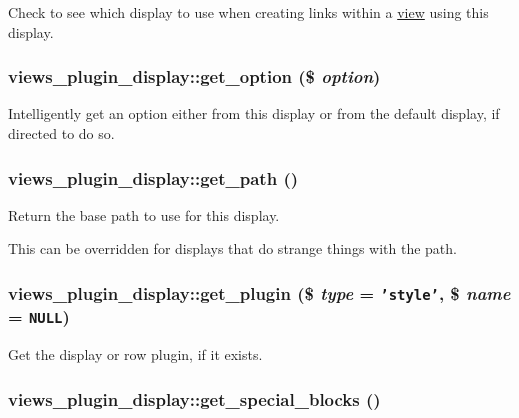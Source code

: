 Check to see which display to use when creating links within a \hyperlink{classview}{view} using this display. \hypertarget{classviews__plugin__display_d2a856f65cb78867204d4f7f877b2972}{
\subsubsection[{get\_\-option}]{\setlength{\rightskip}{0pt plus 5cm}views\_\-plugin\_\-display::get\_\-option (\$ {\em option})}}
\label{classviews__plugin__display_d2a856f65cb78867204d4f7f877b2972}


Intelligently get an option either from this display or from the default display, if directed to do so. \hypertarget{classviews__plugin__display_c9a045f84e31fbe0513482170bd61c01}{
\subsubsection[{get\_\-path}]{\setlength{\rightskip}{0pt plus 5cm}views\_\-plugin\_\-display::get\_\-path ()}}
\label{classviews__plugin__display_c9a045f84e31fbe0513482170bd61c01}


Return the base path to use for this display.

This can be overridden for displays that do strange things with the path. \hypertarget{classviews__plugin__display_7a38d9a80eed86c5c00f7d66002fbf8d}{
\subsubsection[{get\_\-plugin}]{\setlength{\rightskip}{0pt plus 5cm}views\_\-plugin\_\-display::get\_\-plugin (\$ {\em type} = {\tt 'style'}, \/  \$ {\em name} = {\tt NULL})}}
\label{classviews__plugin__display_7a38d9a80eed86c5c00f7d66002fbf8d}


Get the display or row plugin, if it exists. \hypertarget{classviews__plugin__display_1bdcb99f6d9a78a4b035c254af48cb99}{
\subsubsection[{get\_\-special\_\-blocks}]{\setlength{\rightskip}{0pt plus 5cm}views\_\-plugin\_\-display::get\_\-special\_\-blocks ()}}
\label{classviews__plugin__display_1bdcb99f6d9a78a4b035c254af48cb99}


